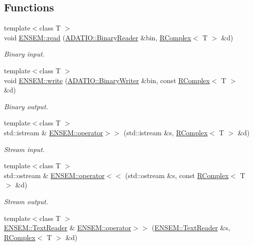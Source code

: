 \subsection*{Functions}
\begin{DoxyCompactItemize}
\item 
{\footnotesize template$<$class T $>$ }\\void \mbox{\hyperlink{group__rcomplex_ga26562c626033349312f9fb8fe7cdabcf}{E\+N\+S\+E\+M\+::read}} (\mbox{\hyperlink{classADATIO_1_1BinaryReader}{A\+D\+A\+T\+I\+O\+::\+Binary\+Reader}} \&bin, \mbox{\hyperlink{classENSEM_1_1RComplex}{R\+Complex}}$<$ T $>$ \&d)
\begin{DoxyCompactList}\small\item\em Binary input. \end{DoxyCompactList}\item 
{\footnotesize template$<$class T $>$ }\\void \mbox{\hyperlink{group__rcomplex_ga5087feb4530a8e07f00227de0852c625}{E\+N\+S\+E\+M\+::write}} (\mbox{\hyperlink{classADATIO_1_1BinaryWriter}{A\+D\+A\+T\+I\+O\+::\+Binary\+Writer}} \&bin, const \mbox{\hyperlink{classENSEM_1_1RComplex}{R\+Complex}}$<$ T $>$ \&d)
\begin{DoxyCompactList}\small\item\em Binary output. \end{DoxyCompactList}\item 
{\footnotesize template$<$class T $>$ }\\std\+::istream \& \mbox{\hyperlink{group__rcomplex_ga8c6191376b048bab19190ecad0d19772}{E\+N\+S\+E\+M\+::operator$>$$>$}} (std\+::istream \&s, \mbox{\hyperlink{classENSEM_1_1RComplex}{R\+Complex}}$<$ T $>$ \&d)
\begin{DoxyCompactList}\small\item\em Stream input. \end{DoxyCompactList}\item 
{\footnotesize template$<$class T $>$ }\\std\+::ostream \& \mbox{\hyperlink{group__rcomplex_ga3e9d2c0a2fe66eca65cad22143bae236}{E\+N\+S\+E\+M\+::operator$<$$<$}} (std\+::ostream \&s, const \mbox{\hyperlink{classENSEM_1_1RComplex}{R\+Complex}}$<$ T $>$ \&d)
\begin{DoxyCompactList}\small\item\em Stream output. \end{DoxyCompactList}\item 
{\footnotesize template$<$class T $>$ }\\\mbox{\hyperlink{classENSEM_1_1TextReader}{E\+N\+S\+E\+M\+::\+Text\+Reader}} \& \mbox{\hyperlink{group__rcomplex_ga6dccaeb2f80acd5c96bc96d929a72852}{E\+N\+S\+E\+M\+::operator$>$$>$}} (\mbox{\hyperlink{classENSEM_1_1TextReader}{E\+N\+S\+E\+M\+::\+Text\+Reader}} \&s, \mbox{\hyperlink{classENSEM_1_1RComplex}{R\+Complex}}$<$ T $>$ \&d)

\end{DoxyCompactItemize}

